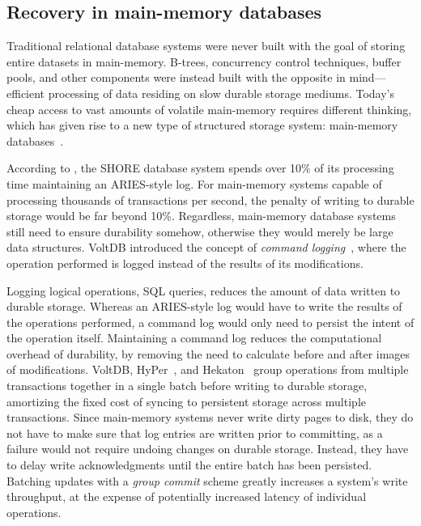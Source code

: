 \subsection{Recovery in main-memory databases}

Traditional relational database systems were never built with the goal of
storing entire datasets in main-memory. B-trees, concurrency control techniques,
buffer pools, and other components were instead built with the opposite in
mind---efficient processing of data residing on slow durable storage mediums.
Today's cheap access to vast amounts of volatile main-memory requires different
thinking, which has given rise to a new type of structured storage system:
main-memory databases~\cite{main-memory}.

According to \cite{oltp}, the SHORE
database system spends over 10\% of its processing time maintaining an
ARIES-style log. For main-memory systems capable of processing thousands of
transactions per second, the penalty of writing to durable storage would be far
beyond 10\%. Regardless, main-memory database systems still need to ensure
durability somehow, otherwise they would merely be large data structures. VoltDB
introduced the concept of \textit{command logging}~\cite{voltdb-recovery}, where
the operation performed is logged instead of the results of its modifications.

Logging logical operations, \eg SQL queries, reduces the amount of data written
to durable storage. Whereas an ARIES-style log would have to write the results
of the operations performed, a command log would only need to persist the intent
of the operation itself. Maintaining a command log reduces the computational
overhead of durability, by removing the need to calculate before and after
images of modifications. VoltDB, HyPer~\cite{hyper}, and Hekaton~\cite{hekaton}
group operations from multiple transactions together in a single batch before
writing to durable storage, amortizing the fixed cost of syncing to persistent
storage across multiple transactions. Since main-memory systems never write
dirty pages to disk, they do not have to make sure that log entries are written
prior to committing, as a failure would not require undoing changes on durable
storage. Instead, they have to delay write acknowledgments until the entire
batch has been persisted. Batching updates with a \textit{group commit} scheme
greatly increases a system's write throughput, at the expense of potentially
increased latency of individual operations.

